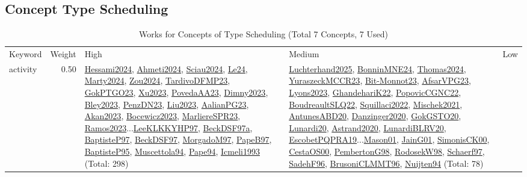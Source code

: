 \clearpage
\subsection{Concept Type Scheduling}
\label{sec:Scheduling}
\label{Scheduling}
{\scriptsize
\begin{longtable}{p{3cm}r>{\raggedright\arraybackslash}p{6cm}>{\raggedright\arraybackslash}p{6cm}>{\raggedright\arraybackslash}p{8cm}}
\rowcolor{white}\caption{Works for Concepts of Type Scheduling (Total 7 Concepts, 7 Used)}\\ \toprule
\rowcolor{white}Keyword & Weight & High & Medium & Low\\ \midrule\endhead
\bottomrule
\endfoot
\index{activity}\index{Scheduling!activity}activity &  0.50 & \hyperref[detail:Hessami2024]{Hessami2024}, \hyperref[detail:Ahmeti2024]{Ahmeti2024}, \hyperref[detail:Sciau2024]{Sciau2024}, \hyperref[detail:Le24]{Le24}, \hyperref[detail:Marty2024]{Marty2024}, \hyperref[detail:Zou2024]{Zou2024}, \hyperref[detail:TardivoDFMP23]{TardivoDFMP23}, \hyperref[detail:GokPTGO23]{GokPTGO23}, \hyperref[detail:Xu2023]{Xu2023}, \hyperref[detail:PovedaAA23]{PovedaAA23}, \hyperref[detail:Dimny2023]{Dimny2023}, \hyperref[detail:Bley2023]{Bley2023}, \hyperref[detail:PenzDN23]{PenzDN23}, \hyperref[detail:Liu2023]{Liu2023}, \hyperref[detail:AalianPG23]{AalianPG23}, \hyperref[detail:Akan2023]{Akan2023}, \hyperref[detail:Bocewicz2023]{Bocewicz2023}, \hyperref[detail:MarliereSPR23]{MarliereSPR23}, \hyperref[detail:Ramos2023]{Ramos2023}...\hyperref[detail:LeeKLKKYHP97]{LeeKLKKYHP97}, \hyperref[detail:BeckDSF97a]{BeckDSF97a}, \hyperref[detail:BaptisteP97]{BaptisteP97}, \hyperref[detail:BeckDSF97]{BeckDSF97}, \hyperref[detail:MorgadoM97]{MorgadoM97}, \hyperref[detail:PapeB97]{PapeB97}, \hyperref[detail:BaptisteP95]{BaptisteP95}, \hyperref[detail:Muscettola94]{Muscettola94}, \hyperref[detail:Pape94]{Pape94}, \hyperref[detail:Icmeli1993]{Icmeli1993} (Total: 298) & \hyperref[detail:Luchterhand2025]{Luchterhand2025}, \hyperref[detail:BonninMNE24]{BonninMNE24}, \hyperref[detail:Thomas2024]{Thomas2024}, \hyperref[detail:YuraszeckMCCR23]{YuraszeckMCCR23}, \hyperref[detail:Bit-Monnot23]{Bit-Monnot23}, \hyperref[detail:AfsarVPG23]{AfsarVPG23}, \hyperref[detail:Lyons2023]{Lyons2023}, \hyperref[detail:GhandehariK22]{GhandehariK22}, \hyperref[detail:PopovicCGNC22]{PopovicCGNC22}, \hyperref[detail:BoudreaultSLQ22]{BoudreaultSLQ22}, \hyperref[detail:Squillaci2022]{Squillaci2022}, \hyperref[detail:Mischek2021]{Mischek2021}, \hyperref[detail:AntunesABD20]{AntunesABD20}, \hyperref[detail:Danzinger2020]{Danzinger2020}, \hyperref[detail:GokGSTO20]{GokGSTO20}, \hyperref[detail:Lunardi20]{Lunardi20}, \hyperref[detail:Astrand2020]{Astrand2020}, \hyperref[detail:LunardiBLRV20]{LunardiBLRV20}, \hyperref[detail:EscobetPQPRA19]{EscobetPQPRA19}...\hyperref[detail:Mason01]{Mason01}, \hyperref[detail:JainG01]{JainG01}, \hyperref[detail:SimonisCK00]{SimonisCK00}, \hyperref[detail:CestaOS00]{CestaOS00}, \hyperref[detail:PembertonG98]{PembertonG98}, \hyperref[detail:RodosekW98]{RodosekW98}, \hyperref[detail:Schaerf97]{Schaerf97}, \hyperref[detail:SadehF96]{SadehF96}, \hyperref[detail:BrusoniCLMMT96]{BrusoniCLMMT96}, \hyperref[detail:Nuijten94]{Nuijten94} (Total: 78) & 
\end{longtable}}
